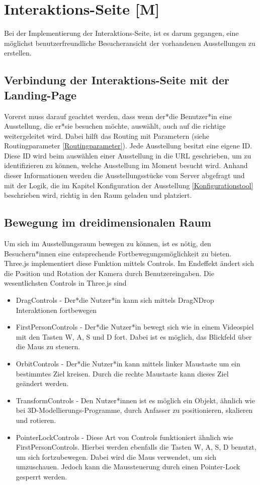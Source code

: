 \section{Interaktions-Seite [M]}

Bei der Implementierung der Interaktions-Seite, ist es darum gegangen, eine möglichst benutzerfreundliche Besucheransicht der vorhandenen Ausstellungen zu erstellen. 

\subsection{Verbindung der Interaktions-Seite mit der Landing-Page
}
Vorerst muss darauf geachtet werden, dass wenn der*die Benutzer*in eine Ausstellung, die er*sie besuchen möchte, auswählt, auch auf die richtige weitergeleitet wird. Dabei hilft das Routing mit Parametern (siehe Routingparameter \ref{Routingparameter}). Jede Ausstellung besitzt eine eigene ID. Diese ID wird beim auswählen einer Ausstellung in die URL geschrieben, um zu identifizieren zu können, welche Ausstellung im Moment besucht wird. Anhand dieser Informationen werden die Ausstellungsstücke vom Server abgefragt und mit der Logik, die im Kapitel Konfiguration der Ausstellung \ref{Konfigurationstool} beschrieben wird, richtig in den Raum geladen und platziert.

\subsection{Bewegung im dreidimensionalen Raum}
\label{controls}
Um sich im Ausstellungsraum bewegen zu können, ist es nötig, den Besuchern*innen eine entsprechende Fortbewegungsmöglichkeit zu bieten. Three.js implementiert diese Funktion mittels Controls. Im Endeffekt ändert sich die Position und Rotation der Kamera durch Benutzereingaben. Die wesentlichsten Controls in Three.js sind

\begin{itemize}
    \item DragControls - Der*die Nutzer*in kann sich mittels DragNDrop Interaktionen fortbewegen \cite{DragControls}
    \item FirstPersonControls - Der*die Nutzer*in bewegt sich wie in einem Videospiel mit den Tasten W, A, S und D fort. Dabei ist es möglich, das Blickfeld über die Maus zu steuern. \cite{FirstPersonControls}
    \item OrbitControls - Der*die Nutzer*in kann mittels linker Maustaste um ein bestimmtes Ziel kreisen. Durch die rechte Maustaste kann dieses Ziel geändert werden. \cite{OrbitControls}
    \item TransformControls - Den Nutzer*innen ist es möglich ein Objekt, ähnlich wie bei 3D-Modellierungs-Programme, durch Anfasser zu positionieren, skalieren und rotieren. \cite{TransformControls}
    \item PointerLockControls - Diese Art von Controls funktioniert ähnlich wie FirstPersonControls. Hierbei werden ebenfalls die Tasten W, A, S, D benutzt, um sich fortzubewegen. Dabei wird die Maus verwendet, um sich umzuschauen. Jedoch kann die Maussteuerung durch einen Pointer-Lock gesperrt werden.\cite{PointerLockControls}
\end{itemize}


